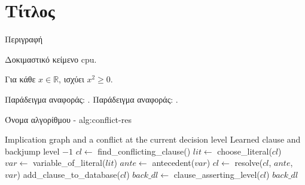 \section{Τίτλος}


\begin{theorem}
Περιγραφή
\end{theorem}

\par Δοκιμαστικό κείμενο \gls{cpu}.


\begin{lemma}
Για κάθε $x\in\mathbb{R}$, ισχύει $x^2\geq 0$.
\end{lemma}

Παράδειγμα αναφοράς: \cite{BALABANOVJIANG2012}.
Παράδειγμα αναφοράς: \cite{papadopoulos2020}.

\begin{myalgorithm}{Όνομα αλγορίθμου - }{alg:conflict-res}
\begin{algorithmic}[1]
    \Require Implication graph and a conflict at the current decision level
    \Ensure Learned clause and backjump level
            \State \Return $-1$
        \EndIf
        \State $cl \gets$ find\_conflicting\_clause()
            \State $lit \gets$ choose\_literal($cl$)
            \State $var \gets$ variable\_of\_literal($lit$)
            \State $ante \gets$ antecedent($var$)
            \State $cl \gets$ resolve($cl$, $ante$, $var$)
        \EndWhile
        \State add\_clause\_to\_database($cl$)
        \State $back\_dl \gets$ clause\_asserting\_level($cl$)
        \State \Return $back\_dl$
    \EndFunction
    \end{algorithmic}
\end{myalgorithm}